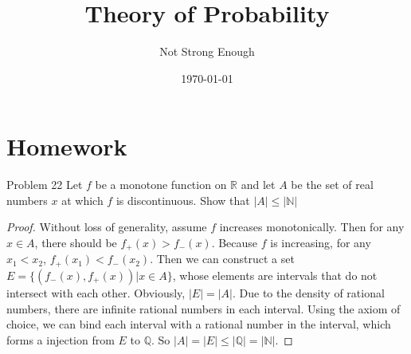 \documentclass[UTF8, a4paper, linespread=1.5]{article}
\title{Theory of Probability}
\date{\today}
\author{Not Strong Enough}
\begin{document}
\maketitle

\section{Homework}
\begin{thm}{Problem 22}{}
	 Let $f$ be a monotone function on $\mathbb{R}$ and let $A$ be the set of real numbers $x$ at which $f$ is discontinuous. Show that $|A| \le |\mathbb{N}|$
\end{thm}
\begin{proof}
	Without loss of generality, assume $f$ increases monotonically. Then for any $x \in A$, there should be $ f_+(x) > f_-(x)$. Because $f$ is increasing, for any $x_1 < x_2$, $ f_+(x_1) < f_-(x_2)$. Then we can construct a set $E=\{(f_-(x),f_+(x)) | x\in A\}$, whose elements are intervals that do not intersect with each other. Obviously, $|E|=|A|$. Due to the density of rational numbers, there are infinite rational numbers in each interval. Using the axiom of choice, we can bind each interval with a rational number in the interval, which forms a injection from $E$ to $\mathbb{Q}$. So $|A|=|E|\le|\mathbb{Q}|=|\mathbb{N}|$.
\end{proof}

	
\end{document}
